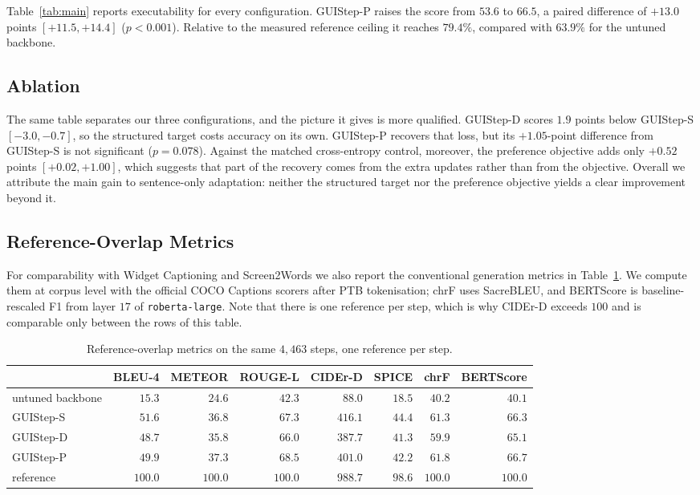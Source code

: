 \documentclass[runningheads,a4paper]{llncs}
\begin{document}
Table~\ref{tab:main} reports executability for every configuration. GUIStep-P raises the score
from $53.6$ to $66.5$, a paired difference of $+13.0$ points $[+11.5,+14.4]$ ($p<0.001$).
Relative to the measured reference ceiling it reaches $79.4\%$, compared with $63.9\%$ for the
untuned backbone.

\subsection{Ablation}

The same table separates our three configurations, and the picture it gives is more qualified.
GUIStep-D scores $1.9$ points below GUIStep-S $[-3.0,-0.7]$, so the structured target costs
accuracy on its own. GUIStep-P recovers that loss, but its $+1.05$-point difference from
GUIStep-S is not significant ($p=0.078$). Against the matched cross-entropy control, moreover,
the preference objective adds only $+0.52$ points $[+0.02,+1.00]$, which suggests that part of
the recovery comes from the extra updates rather than from the objective. Overall we attribute
the main gain to sentence-only adaptation: neither the structured target nor the preference
objective yields a clear improvement beyond it.

\subsection{Reference-Overlap Metrics}
For comparability with Widget Captioning and Screen2Words we also report the conventional
generation metrics in Table~\ref{tab:text}. We compute them at corpus level with the official
COCO Captions scorers after PTB tokenisation; chrF uses SacreBLEU, and BERTScore is
baseline-rescaled F1 from layer $17$ of \texttt{roberta-large}. Note that there is one reference
per step, which is why CIDEr-D exceeds $100$ and is comparable only between the rows of this
table.

\begin{table}[t]
\centering
\caption{Reference-overlap metrics on the same $4{,}463$ steps, one reference per step.}
\label{tab:text}
\setlength{\tabcolsep}{3.6pt}
\begin{tabular}{lrrrrrrr}
\toprule
& BLEU-4 & METEOR & ROUGE-L & CIDEr-D & SPICE & chrF & BERTScore\\
\midrule
untuned backbone & $15.3$ & $24.6$ & $42.3$ & $88.0$ & $18.5$ & $40.2$ & $40.1$\\
GUIStep-S & $51.6$ & $36.8$ & $67.3$ & $416.1$ & $\mathbf{44.4}$ & $61.3$ & $66.3$\\
GUIStep-D & $48.7$ & $35.8$ & $66.0$ & $387.7$ & $41.3$ & $59.9$ & $65.1$\\
GUIStep-P & $49.9$ & $\mathbf{37.3}$ & $\mathbf{68.5}$ & $401.0$ & $42.2$ & $\mathbf{61.8}$ &
$\mathbf{66.7}$\\
\midrule
reference & $100.0$ & $100.0$ & $100.0$ & $988.7$ & $98.6$ & $100.0$ & $100.0$\\
\bottomrule
\end{tabular}
\end{table}
\end{document}
